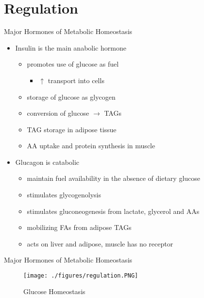 \documentclass[presentation, smaller]{beamer}
\begin{document}
\section{Regulation}
\label{sec:org57ec49d}
\begin{frame}[label={sec:org72a5e1c}]{Major Hormones of Metabolic Homeostasis}
\begin{itemize}
\item \alert{Insulin} is the main anabolic hormone
\begin{itemize}
\item promotes use of glucose as fuel
\begin{itemize}
\item \(\uparrow\) transport into cells
\end{itemize}
\item storage of glucose as glycogen
\item conversion of glucose \(\to\) TAGs
\item TAG storage in adipose tissue
\item AA uptake and protein synthesis in muscle
\end{itemize}
\item \alert{Glucagon} is catabolic
\begin{itemize}
\item maintain fuel availability in the absence of dietary glucose
\item stimulates glycogenolysis
\item stimulates gluconeogenesis from lactate, glycerol and AAs
\item mobilizing FAs from adipose TAGs
\item acts on liver and adipose, muscle has no receptor
\end{itemize}
\end{itemize}
\end{frame}

\begin{frame}[label={sec:orgbcfa7b3}]{Major Hormones of Metabolic Homeostasis}
\begin{figure}[htbp]
\centering
\texttt{[image: ./figures/regulation.PNG]}
\caption{\label{fig:org4d60338}
Glucose Homeostasis}
\end{figure}
\end{frame}
\end{document}
